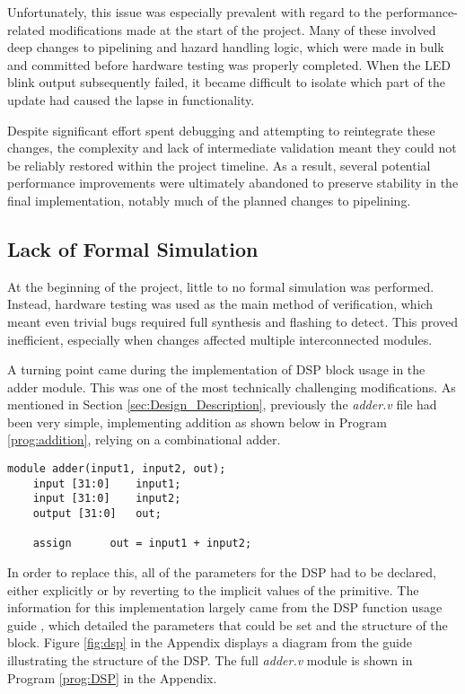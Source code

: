 \documentclass[a4paper,10pt]{article}
\begin{document}
Unfortunately, this issue was especially prevalent with regard to the 
performance-related modifications made at the start of the project. 
Many of these involved deep changes 
to pipelining and hazard handling logic, which were made in bulk 
and committed before hardware testing was properly completed. 
When the LED blink output subsequently failed, it became difficult 
to isolate which part of the update had caused the lapse in functionality. 

Despite significant effort spent debugging and attempting to reintegrate 
these changes, the complexity and lack of intermediate validation 
meant they could not be reliably restored within the project timeline. 
As a result, several potential performance improvements were ultimately 
abandoned to preserve stability in the final implementation,
notably much of the planned changes to pipelining.

\subsection*{Lack of Formal Simulation}
At the beginning of the project, little to no formal simulation was performed. 
Instead, hardware testing was used as the main method of verification, 
which meant even trivial bugs required full synthesis and flashing to detect. 
This proved inefficient, especially when changes 
affected multiple interconnected modules.

A turning point came during the implementation of DSP block usage in the adder module. 
This was one of the most technically challenging modifications.
As mentioned in Section \ref{sec:Design_Description},
previously the \textit{adder.v} file had been very simple,
implementing addition as shown below in Program \ref{prog:addition},
relying on a combinational adder.

\begin{lstlisting}[style=verilog-style, caption=
    {Initial adder.v module}, label={prog:addition}]
module adder(input1, input2, out);
	input [31:0]	input1;
	input [31:0]	input2;
	output [31:0]	out;

	assign		out = input1 + input2;
\end{lstlisting}

In order to replace this, all of the parameters for the DSP had to be declared,
either explicitly or by reverting to the implicit values of the primitive.
The information for this implementation largely came from the 
DSP function usage guide \cite{DSP_guide},
which detailed the parameters that could be set
and the structure of the block.
Figure \ref{fig:dsp} in the Appendix displays a diagram from the guide 
illustrating the structure of the DSP.
The full \textit{adder.v} module is shown in Program \ref{prog:DSP}
in the Appendix.
\end{document}
